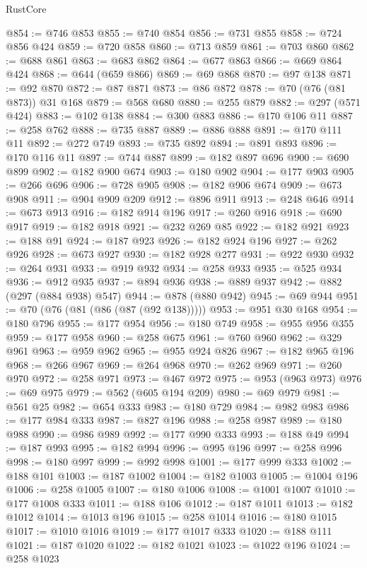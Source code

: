 \begin{lexlean}{RustCore}
\begin{coremodule}
@854 := @746 @853
@855 := @740 @854
@856 := @731 @855
@858 := @724 @856 @424
@859 := @720 @858
@860 := @713 @859
@861 := @703 @860
@862 := @688 @861
@863 := @683 @862
@864 := @677 @863
@866 := @669 @864 @424
@868 := @644 (@659 @866)
@869 := @69 @868
@870 := @97 @138
@871 := @92 @870
@872 := @87 @871
@873 := @86 @872
@878 := @70 (@76 (@81 @873)) @31 @168
@879 := @568 @680
@880 := @255 @879
@882 := @297 (@571 @424)
@883 := @102 @138
@884 := @300 @883
@886 := @170 @106 @11
@887 := @258 @762
@888 := @735 @887
@889 := @886 @888
@891 := @170 @111 @11
@892 := @272 @749
@893 := @735 @892
@894 := @891 @893
@896 := @170 @116 @11
@897 := @744 @887
@899 := @182 @897 @696
@900 := @690 @899
@902 := @182 @900 @674
@903 := @180 @902
@904 := @177 @903
@905 := @266 @696
@906 := @728 @905
@908 := @182 @906 @674
@909 := @673 @908
@911 := @904 @909 @209
@912 := @896 @911
@913 := @248 @646
@914 := @673 @913
@916 := @182 @914 @196
@917 := @260 @916
@918 := @690 @917
@919 := @182 @918
@921 := @232 @269 @85
@922 := @182 @921
@923 := @188 @91
@924 := @187 @923
@926 := @182 @924 @196
@927 := @262 @926
@928 := @673 @927
@930 := @182 @928 @277
@931 := @922 @930
@932 := @264 @931
@933 := @919 @932
@934 := @258 @933
@935 := @525 @934
@936 := @912 @935
@937 := @894 @936
@938 := @889 @937
@942 := @882 (@297 (@884 @938) @547)
@944 := @878 (@880 @942)
@945 := @69 @944
@951 := @70 (@76 (@81 (@86 (@87 (@92 @138)))))
@953 := @951 @30 @168
@954 := @180 @796
@955 := @177 @954
@956 := @180 @749
@958 := @955 @956 @355
@959 := @177 @958
@960 := @258 @675
@961 := @760 @960
@962 := @329 @961
@963 := @959 @962
@965 := @955 @924 @826
@967 := @182 @965 @196
@968 := @266 @967
@969 := @264 @968
@970 := @262 @969
@971 := @260 @970
@972 := @258 @971
@973 := @467 @972
@975 := @953 (@963 @973)
@976 := @69 @975
@979 := @562 (@605 @194 @209)
@980 := @69 @979
@981 := @561 @25
@982 := @654 @333
@983 := @180 @729
@984 := @982 @983
@986 := @177 @984 @333
@987 := @827 @196
@988 := @258 @987
@989 := @180 @988
@990 := @986 @989
@992 := @177 @990 @333
@993 := @188 @49
@994 := @187 @993
@995 := @182 @994
@996 := @995 @196
@997 := @258 @996
@998 := @180 @997
@999 := @992 @998
@1001 := @177 @999 @333
@1002 := @188 @101
@1003 := @187 @1002
@1004 := @182 @1003
@1005 := @1004 @196
@1006 := @258 @1005
@1007 := @180 @1006
@1008 := @1001 @1007
@1010 := @177 @1008 @333
@1011 := @188 @106
@1012 := @187 @1011
@1013 := @182 @1012
@1014 := @1013 @196
@1015 := @258 @1014
@1016 := @180 @1015
@1017 := @1010 @1016
@1019 := @177 @1017 @333
@1020 := @188 @111
@1021 := @187 @1020
@1022 := @182 @1021
@1023 := @1022 @196
@1024 := @258 @1023

\end{coremodule}
\end{lexlean}
